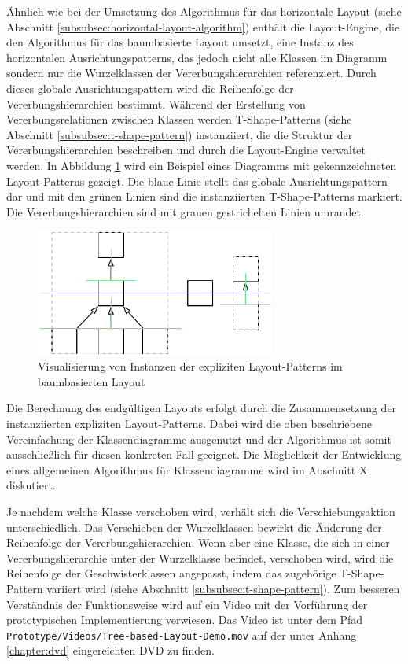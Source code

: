 Ähnlich wie bei der Umsetzung des Algorithmus für das horizontale Layout (siehe Abschnitt \ref{subsubsec:horizontal-layout-algorithm}) enthält die Layout-Engine, die den Algorithmus für das baumbasierte Layout umsetzt, eine Instanz des horizontalen Ausrichtungspatterns, das jedoch nicht alle Klassen im Diagramm sondern nur die Wurzelklassen der Vererbungshierarchien referenziert. Durch dieses globale Ausrichtungspattern wird die Reihenfolge der Vererbungshierarchien bestimmt. Während der Erstellung von Vererbungsrelationen zwischen Klassen werden T-Shape-Patterns (siehe Abschnitt \ref{subsubsec:t-shape-pattern}) instanziiert, die die Struktur der Vererbungshierarchien beschreiben und durch die Layout-Engine verwaltet werden. In Abbildung \ref{fig:tree-based-layout} wird ein Beispiel eines Diagramms mit gekennzeichneten Layout-Patterns gezeigt. Die blaue Linie stellt das globale Ausrichtungspattern dar und mit den grünen Linien sind die instanziierten T-Shape-Patterns markiert. Die Vererbungshierarchien sind mit grauen gestrichelten Linien umrandet.

\begin{figure}[hbt]
    \centering
    \includegraphics[width=0.7\textwidth]{resources/tree-based-layout}
    \caption{Visualisierung von Instanzen der expliziten Layout-Patterns im baumbasierten Layout}
    \label{fig:tree-based-layout}
\end{figure}

Die Berechnung des endgültigen Layouts erfolgt durch die Zusammensetzung der instanziierten expliziten Layout-Patterns. Dabei wird die oben beschriebene Vereinfachung der Klassendiagramme ausgenutzt und der Algorithmus ist somit ausschließlich für diesen konkreten Fall geeignet. Die Möglichkeit der Entwicklung eines allgemeinen Algorithmus für Klassendiagramme wird im Abschnitt X diskutiert.

Je nachdem welche Klasse verschoben wird, verhält sich die Verschiebungsaktion unterschiedlich. Das Verschieben der Wurzelklassen bewirkt die Änderung der Reihenfolge der Vererbungshierarchien. Wenn aber eine Klasse, die sich in einer Vererbungshierarchie unter der Wurzelklasse befindet, verschoben wird, wird die Reihenfolge der Geschwisterklassen angepasst, indem das zugehörige T-Shape-Pattern variiert wird (siehe Abschnitt \ref{subsubsec:t-shape-pattern}). Zum besseren Verständnis der Funktionsweise wird auf ein Video mit der Vorführung der prototypischen Implementierung verwiesen. Das Video ist unter dem Pfad \texttt{Prototype/Videos/Tree-based-Layout-\-De\-mo.mov} auf der unter Anhang \ref{chapter:dvd} eingereichten DVD zu finden.

